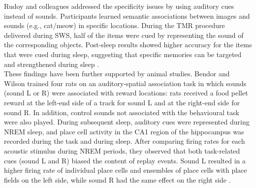 Rudoy and colleagues \parencite{rudoy_strengthening_2009} addressed the specificity issues by using auditory cues instead of sounds. Participants learned semantic associations between images and sounds (e.g., cat/meow) in specific locations. During the TMR procedure delivered during SWS, half of the items were cued by representing the sound of the corresponding objects. Post-sleep results showed higher accuracy for the items that were cued during sleep, suggesting that specific memories can be targeted and strengthened during sleep \parencite{rudoy_strengthening_2009}. \\
These findings have been further supported by animal studies. Bendor and Wilson trained four rats on an auditory-spatial association task in which sounds (sound L or R) were associated with reward locations: rats received a food pellet reward at the left-end side of a track for sound L and at the right-end side for sound R. In addition, control sounds not associated with the behavioural task were also played. During subsequent sleep, auditory cues were represented during NREM sleep, and place cell activity in the CA1 region of the hippocampus was recorded during the task and during sleep. After comparing firing rates for each acoustic stimulus during NREM periods, they observed that both task-related cues (sound L and R) biased the content of replay events. Sound L resulted in a higher firing rate of individual place cells and ensembles of place cells with place fields on the left side, while sound R had the same effect on the right side \parencite{bendor_biasing_2012}.

